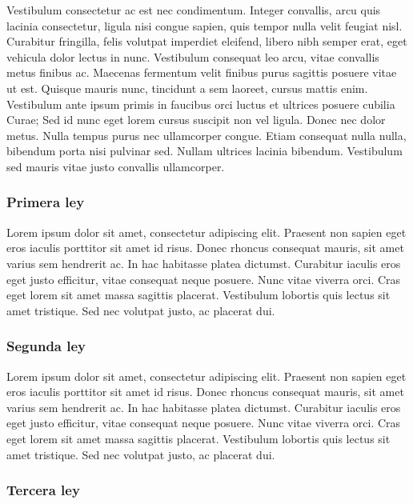 \documentclass[12pt]{article}
\begin{document}
Vestibulum consectetur ac est nec condimentum. Integer convallis, arcu quis lacinia consectetur, ligula nisi congue sapien, quis tempor nulla velit feugiat nisl. Curabitur fringilla, felis volutpat imperdiet eleifend, libero nibh semper erat, eget vehicula dolor lectus in nunc. Vestibulum consequat leo arcu, vitae convallis metus finibus ac. Maecenas fermentum velit finibus purus sagittis posuere vitae ut est. Quisque mauris nunc, tincidunt a sem laoreet, cursus mattis enim. Vestibulum ante ipsum primis in faucibus orci luctus et ultrices posuere cubilia Curae; Sed id nunc eget lorem cursus suscipit non vel ligula. Donec nec dolor metus. Nulla tempus purus nec ullamcorper congue. Etiam consequat nulla nulla, bibendum porta nisi pulvinar sed. Nullam ultrices lacinia bibendum. Vestibulum sed mauris vitae justo convallis ullamcorper.

\bigskip

\subsubsection{Primera ley}

Lorem ipsum dolor sit amet, consectetur adipiscing elit. Praesent non sapien eget eros iaculis porttitor sit amet id risus. Donec rhoncus consequat mauris, sit amet varius sem hendrerit ac. In hac habitasse platea dictumst. Curabitur iaculis eros eget justo efficitur, vitae consequat neque posuere. Nunc vitae viverra orci. Cras eget lorem sit amet massa sagittis placerat. Vestibulum lobortis quis lectus sit amet tristique. Sed nec volutpat justo, ac placerat dui. 

\subsubsection{Segunda ley}

Lorem ipsum dolor sit amet, consectetur adipiscing elit. Praesent non sapien eget eros iaculis porttitor sit amet id risus. Donec rhoncus consequat mauris, sit amet varius sem hendrerit ac. In hac habitasse platea dictumst. Curabitur iaculis eros eget justo efficitur, vitae consequat neque posuere. Nunc vitae viverra orci. Cras eget lorem sit amet massa sagittis placerat. Vestibulum lobortis quis lectus sit amet tristique. Sed nec volutpat justo, ac placerat dui. 

\subsubsection{Tercera ley}
\end{document}
